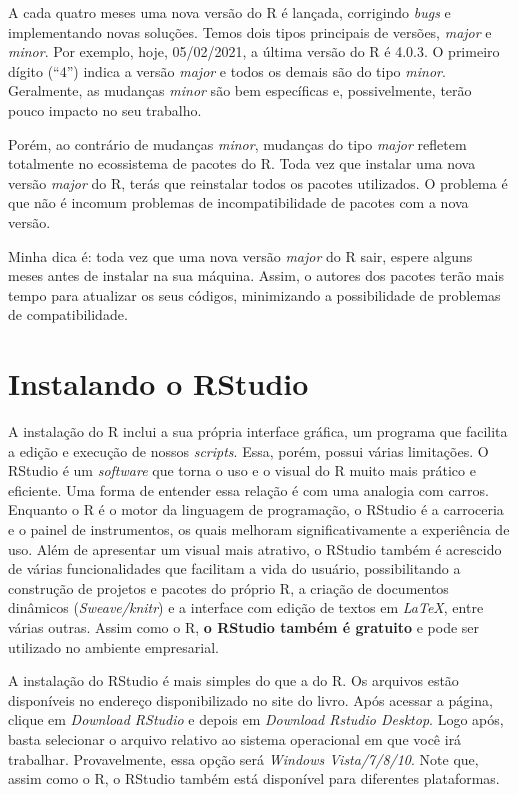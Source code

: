 \documentclass[
  11pt,
]{book}
\newenvironment{rmdimportant}
{\begin{importantblock}

	} {\end{importantblock}}
\begin{document}
\begin{rmdimportant}
A cada quatro meses uma nova versão do R é lançada, corrigindo
\emph{bugs} e implementando novas soluções. Temos dois tipos principais
de versões, \emph{major} e \emph{minor}. Por exemplo, hoje, 05/02/2021,
a última versão do R é 4.0.3. O primeiro dígito (``4'') indica a versão
\emph{major} e todos os demais são do tipo \emph{minor}. Geralmente, as
mudanças \emph{minor} são bem específicas e, possivelmente, terão pouco
impacto no seu trabalho.

Porém, ao contrário de mudanças \emph{minor}, mudanças do tipo
\emph{major} refletem totalmente no ecossistema de pacotes do R. Toda
vez que instalar uma nova versão \emph{major} do R, terás que reinstalar
todos os pacotes utilizados. O problema é que não é incomum problemas de
incompatibilidade de pacotes com a nova versão.

Minha dica é: toda vez que uma nova versão \emph{major} do R sair,
espere alguns meses antes de instalar na sua máquina. Assim, o autores
dos pacotes terão mais tempo para atualizar os seus códigos, minimizando
a possibilidade de problemas de compatibilidade.
\end{rmdimportant}

\hypertarget{instalando-o-rstudio}{%
\section{Instalando o RStudio}\label{instalando-o-rstudio}}

A instalação do R inclui a sua própria interface gráfica, um programa que facilita a edição e execução de nossos \emph{scripts}. Essa, porém, possui várias limitações. O RStudio é um \emph{software} que torna o uso e o visual do R muito mais prático e eficiente. Uma forma de entender essa relação é com uma analogia com carros. Enquanto o R é o motor da linguagem de programação, o RStudio é a carroceria e o painel de instrumentos, os quais melhoram significativamente a experiência de uso. Além de apresentar um visual mais atrativo, o RStudio também é acrescido de várias funcionalidades que facilitam a vida do usuário, possibilitando a construção de projetos e pacotes do próprio R, a criação de documentos dinâmicos (\emph{Sweave/knitr}) e a interface com edição de textos em \emph{LaTeX}, entre várias outras. Assim como o R, \textbf{o RStudio também é gratuito} e pode ser utilizado no ambiente empresarial.

A instalação do RStudio é mais simples do que a do R. Os arquivos estão disponíveis no endereço disponibilizado no site do livro. Após acessar a página, clique em \emph{Download RStudio} e depois em \emph{Download Rstudio Desktop}. Logo após, basta selecionar o arquivo relativo ao sistema operacional em que você irá trabalhar. Provavelmente, essa opção será \emph{Windows Vista/7/8/10}. Note que, assim como o R, o RStudio também está disponível para diferentes plataformas.
\end{document}
